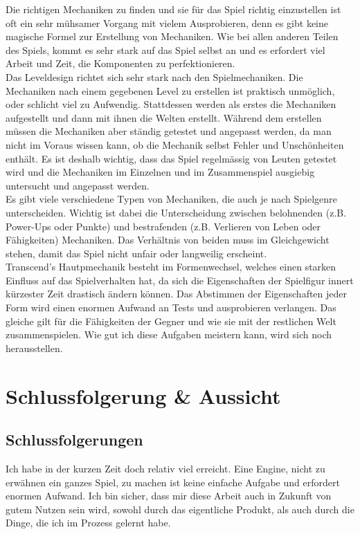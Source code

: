 \documentclass[12pt,a4paper,titlepage]{article}
\begin{document}
		Die richtigen Mechaniken zu finden und sie für das Spiel richtig einzustellen ist oft ein sehr mühsamer Vorgang mit vielem Ausprobieren, denn es gibt keine magische Formel zur Erstellung von Mechaniken. Wie bei allen anderen Teilen des Spiels, kommt es sehr stark auf das Spiel selbst an und es erfordert viel Arbeit und Zeit, die Komponenten zu perfektionieren.\\
		
		Das Leveldesign richtet sich sehr stark nach den Spielmechaniken. Die Mechaniken nach einem gegebenen Level zu erstellen ist praktisch unmöglich, oder schlicht viel zu Aufwendig. Stattdessen werden als erstes die Mechaniken aufgestellt und  dann mit ihnen die Welten erstellt. Während dem erstellen müssen die Mechaniken aber ständig getestet und angepasst werden, da man nicht im Voraus wissen kann, ob die Mechanik selbst Fehler und Unschönheiten enthält. Es ist deshalb wichtig, dass das Spiel regelmässig von Leuten getestet wird und die Mechaniken im Einzelnen und im Zusammenspiel ausgiebig untersucht und angepasst werden.\\
		
		Es gibt viele verschiedene Typen von Mechaniken, die auch je nach Spielgenre unterscheiden. Wichtig ist dabei die Unterscheidung zwischen belohnenden (z.B. Power-Ups oder Punkte) und bestrafenden (z.B. Verlieren von Leben oder Fähigkeiten) Mechaniken. Das Verhältnis von beiden muss im Gleichgewicht stehen, damit das Spiel nicht unfair oder langweilig erscheint.\\
		
		Transcend's Hautpmechanik besteht im Formenwechsel, welches einen starken Einfluss auf das Spielverhalten hat, da sich die Eigenschaften der Spielfigur innert kürzester Zeit drastisch ändern können. Das Abstimmen der Eigenschaften jeder Form wird einen enormen Aufwand an Tests und ausprobieren verlangen. Das gleiche gilt für die Fähigkeiten der Gegner und wie sie mit der restlichen Welt zusammenspielen. Wie gut ich diese Aufgaben meistern kann, wird sich noch herausstellen.
		
	
\section{Schlussfolgerung \& Aussicht}
	\subsection{Schlussfolgerungen}
		Ich habe in der kurzen Zeit doch relativ viel erreicht. Eine Engine, nicht zu erwähnen ein ganzes Spiel, zu machen ist keine einfache Aufgabe und erfordert enormen Aufwand.  Ich bin sicher, dass mir diese Arbeit auch in Zukunft von gutem Nutzen sein wird, sowohl durch das eigentliche Produkt, als auch durch die Dinge, die ich im Prozess gelernt habe.\\
		
\end{document}
